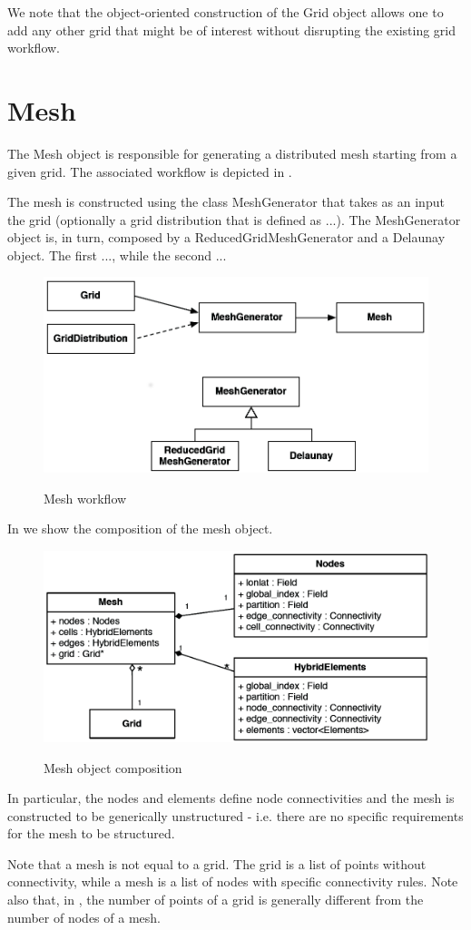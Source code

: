 We note that the object-oriented construction of the Grid 
object allows one to add any other grid that might be of 
interest without disrupting the existing grid workflow.



\section{Mesh}
The Mesh object is responsible for generating a distributed 
mesh starting from a given grid. The associated workflow is 
depicted in .

The mesh is constructed using the class MeshGenerator that 
takes as an input the grid (optionally a grid distribution 
that is defined as ...).
The MeshGenerator object is, in turn, composed by a ReducedGridMeshGenerator 
and a Delaunay object. The first ..., while the second ...
%
\begin{figure}
\centering
\includegraphics[scale=0.25]{imgs/mesh1.png}
\label{fig:mesh1}
\caption{Mesh workflow}
\end{figure}
% 
In  we show the composition of the mesh object.
%
\begin{figure}
\centering
\includegraphics[scale=0.25]{imgs/mesh2.png}
\label{fig:mesh2}
\caption{Mesh object composition}
\end{figure}
%
In particular, the nodes and elements define node connectivities 
and the mesh is constructed to be generically unstructured - i.e. 
there are no specific requirements for the mesh to be structured.
%
\begin{warningbox}
Note that a mesh is not equal to a grid. The grid is a list of points 
without connectivity, while a mesh is a list of nodes with specific 
connectivity rules. Note also that, in \Atlas, the number of points 
of a grid is generally different from the number of nodes of a mesh.
\end{warningbox}
%

